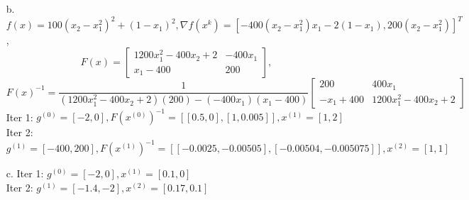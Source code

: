 \documentclass{article}
\begin{document}
\begin{itemize}
\begin{itemize}
			\item[b.] $f(x) = 100(x_2 - x_1^2)^2 + (1 - x_1)^2, \nabla f(x^k) = [-400(x_2 - x_1^2)x_1 - 2(1-x_1), 200(x_2 - x_1^2)]^T$,
			\begin{displaymath}
			F(x) = \left[ \begin{array}{cc}
				1200 x_1^2 - 400 x_2 + 2 & -400 x_1 \\
				x_1 - 400 & 200
			\end{array} \right],
			\end{displaymath}
			\begin{displaymath}
			F(x)^{-1} = \frac{1}{(1200 x_1^2 - 400 x_2 + 2) (200) - (-400 x_1) (x_1 - 400)} \left[ \begin{array}{cc}
				200 & 400 x_1 \\
				-x_1 + 400 & 1200 x_1^2 - 400 x_2 + 2
			\end{array} \right]
			\end{displaymath}
			Iter 1: $g^{(0)} = [-2, 0], F(x^{(0)})^{-1} = [[0.5, 0], [1, 0.005]], x^{(1)} = [1, 2]$ \\
			Iter 2: $g^{(1)} = [-400, 200], F(x^{(1)})^{-1} = [[-0.0025, -0.00505], [-0.00504, -0.005075]], x^{(2)} = [1, 1]$
			\item[c.] Iter 1: $g^{(0)} = [-2, 0], x^{(1)} = [0.1, 0]$ \\
				Iter 2: $g^{(1)} = [-1.4, -2], x^{(2)} = [0.17, 0.1]$ \\
		\end{itemize}
\end{itemize}
\end{document}
